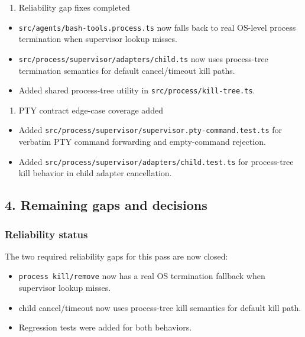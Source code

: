 \begin{enumerate}
  \item Reliability gap fixes completed
\end{enumerate}


\begin{itemize}
  \item \texttt{src/agents/bash-tools.process.ts} now falls back to real OS-level process termination when supervisor lookup misses.
  \item \texttt{src/process/supervisor/adapters/child.ts} now uses process-tree termination semantics for default cancel/timeout kill paths.
  \item Added shared process-tree utility in \texttt{src/process/kill-tree.ts}.
\end{itemize}


\begin{enumerate}
  \item PTY contract edge-case coverage added
\end{enumerate}


\begin{itemize}
  \item Added \texttt{src/process/supervisor/supervisor.pty-command.test.ts} for verbatim PTY command forwarding and empty-command rejection.
  \item Added \texttt{src/process/supervisor/adapters/child.test.ts} for process-tree kill behavior in child adapter cancellation.
\end{itemize}


\subsection{4. Remaining gaps and decisions}


\subsubsection{Reliability status}


The two required reliability gaps for this pass are now closed:

\begin{itemize}
  \item \texttt{process kill/remove} now has a real OS termination fallback when supervisor lookup misses.
  \item child cancel/timeout now uses process-tree kill semantics for default kill path.
  \item Regression tests were added for both behaviors.
\end{itemize}


